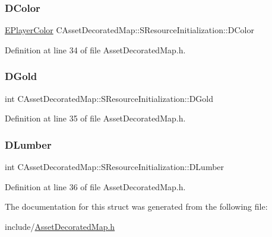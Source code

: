 \subsubsection{\texorpdfstring{D\+Color}{DColor}}
{\footnotesize\ttfamily \hyperlink{GameDataTypes_8h_aafb0ca75933357ff28a6d7efbdd7602f}{E\+Player\+Color} C\+Asset\+Decorated\+Map\+::\+S\+Resource\+Initialization\+::\+D\+Color}



Definition at line 34 of file Asset\+Decorated\+Map.\+h.

\hypertarget{structCAssetDecoratedMap_1_1SResourceInitialization_ad47be91c742a06b57bd3a97010625857}{}\label{structCAssetDecoratedMap_1_1SResourceInitialization_ad47be91c742a06b57bd3a97010625857} 
\subsubsection{\texorpdfstring{D\+Gold}{DGold}}
{\footnotesize\ttfamily int C\+Asset\+Decorated\+Map\+::\+S\+Resource\+Initialization\+::\+D\+Gold}



Definition at line 35 of file Asset\+Decorated\+Map.\+h.

\hypertarget{structCAssetDecoratedMap_1_1SResourceInitialization_a4592777f741383161a49bce10f2c1932}{}\label{structCAssetDecoratedMap_1_1SResourceInitialization_a4592777f741383161a49bce10f2c1932} 
\subsubsection{\texorpdfstring{D\+Lumber}{DLumber}}
{\footnotesize\ttfamily int C\+Asset\+Decorated\+Map\+::\+S\+Resource\+Initialization\+::\+D\+Lumber}



Definition at line 36 of file Asset\+Decorated\+Map.\+h.



The documentation for this struct was generated from the following file\+:\begin{DoxyCompactItemize}
\item 
include/\hyperlink{AssetDecoratedMap_8h}{Asset\+Decorated\+Map.\+h}\end{DoxyCompactItemize}
